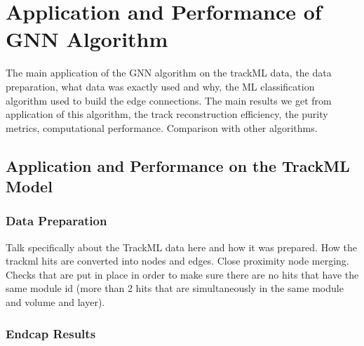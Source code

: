
\chapter{Application and Performance of GNN Algorithm}
\label{chapter-6}


The main application of the GNN algorithm on the trackML data, the data preparation, what data was exactly used and why, the ML classification algorithm used to build the edge connections. The main results we get from application of this algorithm, the track reconstruction efficiency, the purity metrics, computational performance. Comparison with other algorithms.

\section{Application and Performance on the TrackML Model}

\subsection{Data Preparation}
Talk specifically about the TrackML data here and how it was prepared. How the trackml hits are converted into nodes and edges. Close proximity node merging. Checks that are put in place in order to make sure there are no hits that have the same module id (more than 2 hits that are simultaneously in the same module and volume and layer).

\subsection{Endcap Results}


